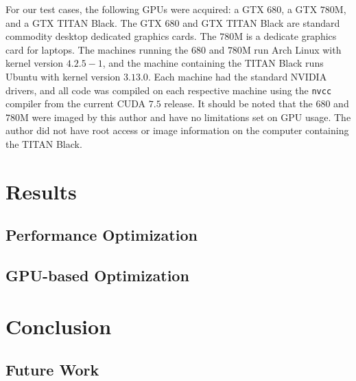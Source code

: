 \documentclass[10pt]{IEEEtran}
\newcommand{\?}{\stackrel{?}{=}}
\begin{document}
For our test cases, the following GPUs were acquired: a GTX $680$, a GTX $780$M, 
and a GTX TITAN Black. The GTX $680$ and GTX TITAN Black are standard commodity
desktop dedicated graphics cards. The $780$M is a dedicate graphics card for 
laptops. The machines running the $680$ and $780$M run Arch Linux with kernel
version $4.2.5-1$, and the machine containing the TITAN Black runs Ubuntu with 
kernel version $3.13.0$. Each machine had the standard NVIDIA drivers, and 
all code was compiled on each respective machine using the \texttt{nvcc} compiler
from the current CUDA $7.5$ release. It should be noted that the $680$ and $780$M
were imaged by this author and have no limitations set on GPU usage. The author
did not have root access or image information on the computer containing the 
TITAN Black.

\section{Results}
\subsection{Performance Optimization}
\subsection{GPU-based Optimization}

\section{Conclusion}
\subsection{Future Work}
\end{document}
